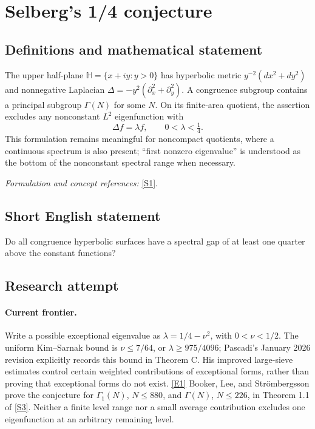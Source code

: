 \documentclass[11pt]{article}
\newcommand{\sref}[2]{\hyperlink{source:#1:#2}{[S#2]}}
\newcommand{\eref}[2]{\hyperlink{extra:#1:#2}{[E#2]}}
\newif\ifshowcatalogue
\newcommand{\cataloguescope}[1]{\ifshowcatalogue
 \paragraph{Exact scope in the supplied catalogue.}
 \begin{quote}\small #1\end{quote}\fi}
\begin{document}
\setcounter{section}{0}
\clearpage
\section*{\texorpdfstring{Selberg's 1/4 conjecture}{Selberg's 1/4 conjecture}}\label{9400079}
\subsection{Definitions and mathematical statement}
The upper half-plane $\mathbb H=\{x+iy:y>0\}$ has hyperbolic metric $y^{-2}(dx^2+dy^2)$ and nonnegative Laplacian $\Delta=-y^2(\partial_x^2+\partial_y^2)$. A congruence subgroup contains a principal subgroup $\Gamma(N)$ for some $N$. On its finite-area quotient, the assertion excludes any nonconstant $L^2$ eigenfunction with
\[
 \Delta f=\lambda f,\qquad0<\lambda<\tfrac14.
\]
This formulation remains meaningful for noncompact quotients, where a continuous spectrum is also present; ``first nonzero eigenvalue'' is understood as the bottom of the nonconstant spectral range when necessary.
\par\smallskip\textit{Formulation and concept references:} \sref{9400079}{1}.
\cataloguescope{Prove that the first nonzero eigenvalue lambda\_1 of the Laplace-Beltrami operator on every congruence quotient of the upper half-plane is at least 1/4.}
\subsection{Short English statement}
Do all congruence hyperbolic surfaces have a spectral gap of at least one quarter above the constant functions?
\subsection{Research attempt}

\paragraph{Current frontier.}
Write a possible exceptional eigenvalue as $\lambda=1/4-\nu^2$, with
$0<\nu<1/2$. The uniform Kim--Sarnak bound is
$\nu\le 7/64$, or $\lambda\ge 975/4096$; Pascadi's January 2026 revision
explicitly records this bound in Theorem C. His improved large-sieve estimates
control certain weighted contributions of exceptional forms, rather than proving
that exceptional forms do not exist. \eref{9400079}{1}
Booker, Lee, and Str\"ombergsson prove the conjecture for $\Gamma_1(N)$,
$N\le880$, and $\Gamma(N)$, $N\le226$, in Theorem 1.1 of
\sref{9400079}{3}. Neither a finite level range nor a small average contribution
excludes one eigenfunction at an arbitrary remaining level.
\end{document}
